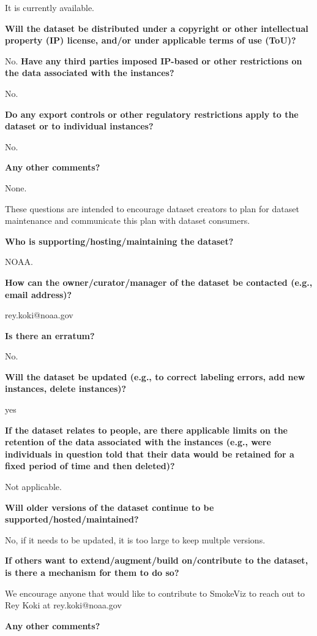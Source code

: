 \documentclass{article}
\begin{document}
It is currently available.

\textbf{Will the dataset be distributed under a copyright or other intellectual property (IP) license, and/or under applicable terms of use (ToU)?}

No.
\textbf{Have any third parties imposed IP-based or other restrictions on the data associated with the instances?}

No.

\textbf{Do any export controls or other regulatory restrictions apply to the dataset or to individual instances?}

No.

\textbf{Any other comments?}

None.


These questions are intended to encourage dataset creators to plan for dataset maintenance
and communicate this plan with dataset consumers.

\textbf{Who is supporting/hosting/maintaining the dataset?}

NOAA.

\textbf{How can the owner/curator/manager of the dataset be contacted (e.g., email address)?}

rey.koki@noaa.gov

\textbf{Is there an erratum?}

No.

\textbf{Will the dataset be updated (e.g., to correct labeling errors, add new instances, delete instances)?}

yes

\textbf{If the dataset relates to people, are there applicable limits on the retention of the data associated with the instances (e.g., were individuals in question told that their data would be retained for a fixed period of time and then deleted)?}

Not applicable.

\textbf{Will older versions of the dataset continue to be supported/hosted/maintained?}

No, if it needs to be updated, it is too large to keep multple versions.

\textbf{If others want to extend/augment/build on/contribute to the dataset, is there a mechanism for them to do so?}

We encourage anyone that would like to contribute to SmokeViz to reach out to Rey Koki at rey.koki@noaa.gov

\textbf{Any other comments?}
\end{document}
